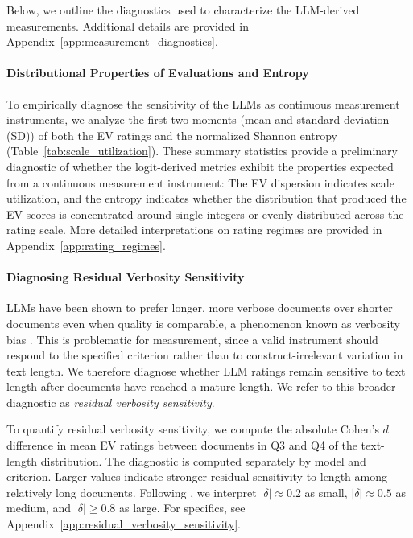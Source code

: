 Below, we outline the diagnostics used to characterize the LLM-derived measurements. Additional details are provided in Appendix~\ref{app:measurement_diagnostics}.



\paragraph{Distributional Properties of Evaluations and Entropy}

To empirically diagnose the sensitivity of the LLMs as continuous measurement instruments, we analyze the first two moments (mean and standard deviation (SD)) of both the EV ratings and the normalized Shannon entropy (Table~\ref{tab:scale_utilization}). These summary statistics provide a preliminary diagnostic of whether the logit-derived metrics exhibit the properties expected from a continuous measurement instrument: The EV dispersion indicates scale utilization, and the entropy indicates whether the distribution that produced the EV scores is concentrated around single integers or evenly distributed across the rating scale. More detailed interpretations on rating regimes are provided in Appendix~\ref{app:rating_regimes}.

\paragraph{Diagnosing Residual Verbosity Sensitivity}

LLMs have been shown to prefer longer, more verbose documents over shorter documents even when quality is comparable, a phenomenon known as verbosity bias \citep{saito_verbosity_2023}. This is problematic for measurement, since a valid instrument should respond to the specified criterion rather than to construct-irrelevant variation in text length. We therefore diagnose whether LLM ratings remain sensitive to text length after documents have reached a mature length. We refer to this broader diagnostic as \textit{residual verbosity sensitivity}. 

To quantify residual verbosity sensitivity, we compute the absolute Cohen's $d$ difference in mean EV ratings between documents in Q3 and Q4 of the text-length distribution. The diagnostic is computed separately by model and criterion. Larger values indicate stronger residual sensitivity to length among relatively long documents. Following \citet{cohen1988statistical}, we interpret $|\delta| \approx 0.2$ as small, $|\delta| \approx 0.5$ as medium, and $|\delta| \geq 0.8$ as large. For specifics, see Appendix~\ref{app:residual_verbosity_sensitivity}.


